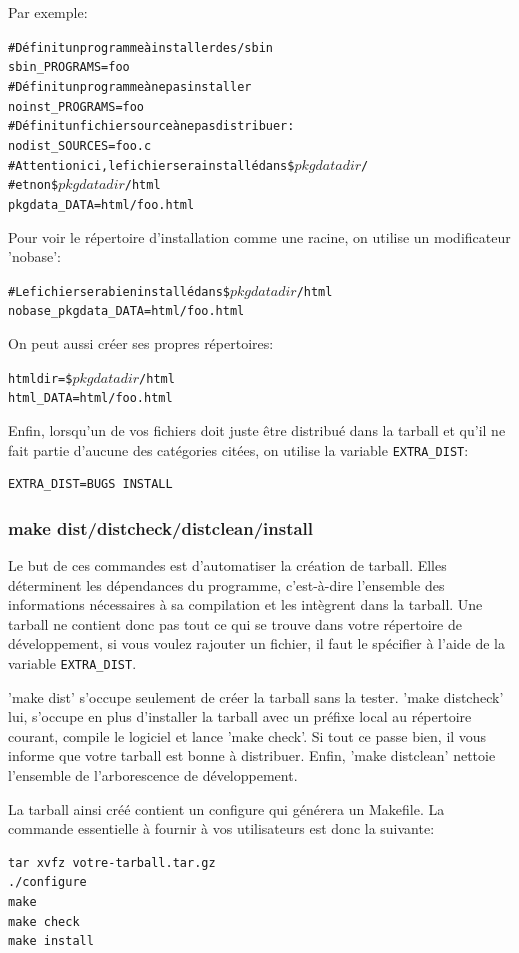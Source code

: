 \documentclass[11pt,a4paper]{article}
\begin{document}
\noindent Par exemple:
{\small
\begin{alltt}
# Définit un programme à installer des /sbin
sbin_PROGRAMS=foo
# Définit un programme à ne pas installer
noinst_PROGRAMS=foo
# Définit un fichier source à ne pas distribuer:
nodist_SOURCES=foo.c
# Attention ici, le fichier sera installé dans \$\(pkgdatadir\)/
# et non \$\(pkgdatadir\)/html
pkgdata_DATA=html/foo.html
\end{alltt}
}

Pour voir le répertoire d'installation comme une racine, on utilise un
modificateur 'nobase':
{\small
\begin{alltt}
# Le fichier sera bien installé dans \$\(pkgdatadir\)/html
nobase_pkgdata_DATA=html/foo.html
\end{alltt}
}

On peut aussi créer ses propres répertoires:
{\small
\begin{alltt}
htmldir=\$\(pkgdatadir\)/html
html_DATA=html/foo.html
\end{alltt}
}

Enfin, lorsqu'un de vos fichiers doit juste être distribué dans la
tarball et qu'il ne fait partie d'aucune des catégories citées, on
utilise la variable \texttt{EXTRA\_DIST}:
{\small
\begin{verbatim}
EXTRA_DIST=BUGS INSTALL
\end{verbatim}
}

\subsubsection{make dist/distcheck/distclean/install}

Le but de ces commandes est d'automatiser la création de
tarball. Elles déterminent les dépendances du programme, c'est-à-dire
l'ensemble des informations nécessaires à sa compilation et les
intègrent dans la tarball. Une tarball ne contient donc pas tout ce
qui se trouve dans votre répertoire de développement, si vous voulez
rajouter un fichier, il faut le spécifier à l'aide de la variable
\texttt{EXTRA\_DIST}.

'make dist' s'occupe seulement de créer la tarball sans la
tester. 'make distcheck' lui, s'occupe en plus d'installer la tarball
avec un préfixe local au répertoire courant, compile le logiciel et
lance 'make check'. Si tout ce passe bien, il vous informe que votre
tarball est bonne à distribuer. Enfin, 'make distclean' nettoie
l'ensemble de l'arborescence de développement.

La tarball ainsi créé contient un configure qui générera un
Makefile. La commande essentielle à fournir à vos utilisateurs est
donc la suivante:
{\small
\begin{verbatim}
tar xvfz votre-tarball.tar.gz
./configure
make
make check
make install
\end{verbatim}
}
\end{document}
